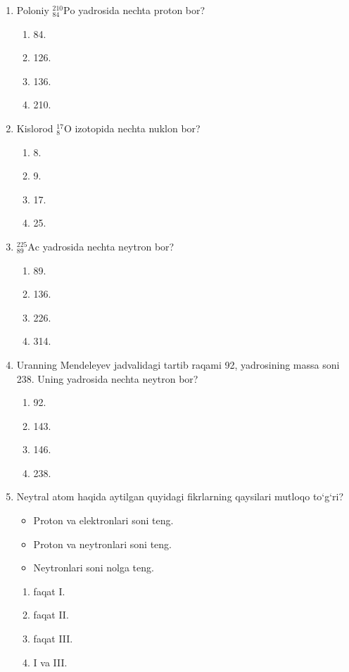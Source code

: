 \begin{enumerate}
\item Poloniy $^{210}_{84}\text{Po}$ yadrosida nechta proton bor?
\begin{enumerate}[label=\Alph*)]
\item 84.
\item 126.
\item 136.
\item 210.
\end{enumerate}

\item Kislorod $^{17}_8\text{O}$ izotopida nechta nuklon bor?
\begin{enumerate}[label=\Alph*)]
\item 8.
\item 9.
\item 17.
\item 25.
\end{enumerate}

\item $^{225}_{89}\text{Ac}$ yadrosida nechta neytron bor?
\begin{enumerate}[label=\Alph*)]
\item 89.
\item 136.
\item 226.
\item 314.
\end{enumerate}

\item Uranning Mendeleyev jadvalidagi tartib raqami 92, yadrosining massa soni 238. Uning yadrosida nechta neytron bor?
\begin{enumerate}[label=\Alph*)]
\item 92.
\item 143.
\item 146.
\item 238.
\end{enumerate}

\item Neytral atom haqida aytilgan quyidagi fikrlarning qaysilari mutloqo to‘g‘ri?
\begin{itemize}
    \item[I.] Proton va elektronlari soni teng.
    \item[II.] Proton va neytronlari soni teng.
    \item[III.] Neytronlari soni nolga teng.
\end{itemize}
\begin{enumerate}[label=\Alph*)]
\item faqat I.
\item faqat II.
\item faqat III.
\item I va III.
\end{enumerate}


\end{enumerate}
